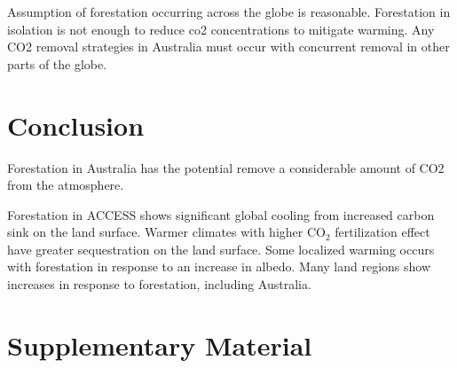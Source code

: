 \documentclass[]{article}
\begin{document}
Assumption of forestation occurring across the globe is reasonable.
Forestation in isolation is not enough to reduce co2 concentrations to mitigate warming.
Any CO2 removal strategies in Australia must occur with concurrent removal in other parts of the globe.

\section{Conclusion}

Forestation in Australia has the potential remove a considerable amount of CO2 from the atmosphere.

Forestation in ACCESS shows significant global cooling from increased carbon sink on the land surface.
Warmer climates with higher CO$_2$ fertilization effect have greater sequestration on the land surface.
Some localized warming occurs with forestation in response to an increase in albedo. 
Many land regions show increases in response to forestation, including Australia.

\printbibliography

\section{Supplementary Material}
\setcounter{figure}{0}
\end{document}
